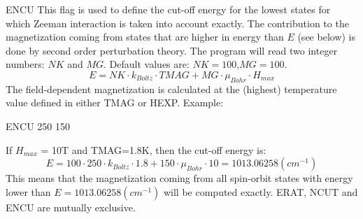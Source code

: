 \begin{keywordlist}
\item[ENCU]
This flag is used to define the cut-off energy for the lowest states for which Zeeman interaction is taken into account exactly. The contribution to the magnetization coming from states that are higher in energy than $E$ (see below) is done by second order perturbation theory. The program will read two integer numbers: $NK$ and $MG$. Default values are: $NK=100$,$MG=100$.
\begin{displaymath}
E=NK \cdot k_{Boltz} \cdot TMAG + MG \cdot \mu_{Bohr} \cdot H_{max}
\end{displaymath}
The field-dependent magnetization is calculated at the (highest) temperature value defined in either TMAG or HEXP.
Example:
\begin{inputlisting}
ENCU
250  150
\end{inputlisting}
If $H_{max}$ = 10T and TMAG=1.8K, then the cut-off energy is:
\begin{displaymath}
 E=100 \cdot 250 \cdot k_{Boltz} \cdot 1.8 + 150 \cdot \mu_{Bohr} \cdot 10 = 1013.06258 (cm^{-1})
\end{displaymath}
This means that the magnetization coming from all spin-orbit states with energy lower than $E=1013.06258 (cm^{-1})$ will be computed exactly.
ERAT, NCUT and ENCU are mutually exclusive.






\end{keywordlist}
